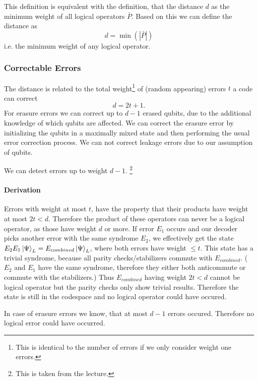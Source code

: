This definition is equivalent with the definition, 
that the distance $d$ as the minimum weight of all logical operators $\bar{P}$. 
Based on this we can define the distance as
\begin{equation}
    d = \min( |\bar{P}| )
\end{equation}
i.e. the minimum weight of any logical operator.\cite{QECmemory}


\subsubsection{Correctable Errors}
The distance is related to the total weight\footnote{
    This is identical to the number of errors if we only consider weight one errors.
    } of (random appearing) errors $t$ a code can correct \cite{QECintro}
\begin{equation}
    d = 2t+1.
\end{equation}
For erasure errors we can correct up to $d-1$ erased qubits, 
due to the additional knowledge of which qubits are affected. 
We can correct the erasure error by initializing the qubits in a maximally mixed state 
and then performing the usual error correction process.\cite{QECmemory}
We can not correct leakage errors due to our assumption of qubits.

We can detect errors up to weight $d-1$. \footnote{This is taken from the lecture.}

\paragraph{Derivation}
Errors with weight at most $t$, have the property that their products have weight at most $2t<d$.
Therefore the product of these operators can never be a logical operator, as those have weight $d$ or more. 
If error $E_1$ occurs and our decoder picks another error with the same syndrome $E_2$, 
we effectively get the state $E_2 E_1 \ket{\Psi}_L = E_{combined} \ket{\Psi}_L$, where both errors have weight $\leq t$.
This state has a trivial syndrome, because all parity checks/stabilizers commute with $E_{combined}$.
($E_2$ and $E_1$ have the same syndrome, therefore they either both anticommute or commute with the stabilizers.) 
Thus $E_{combined}$ having weight $2t<d$ cannot be logical operator but the parity checks only show trivial results. 
Therefore the state is still in the codespace and no logical operator could have occured.\cite{QECmemory}

In case of erasure errors we know, that at most $d-1$ errors occured.
Therefore no logical error could have occurred. 

